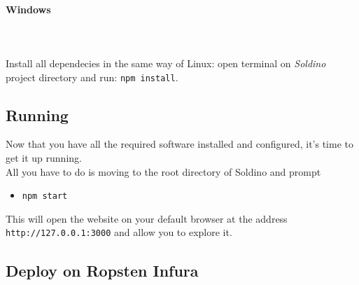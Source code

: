 \paragraph{Windows} \mbox{} \\ \mbox{} \\
Install all dependecies in the same way of Linux: open terminal on \textit{Soldino} project directory and run: \texttt{npm install}.

\subsection{Running}
Now that you have all the required software installed and configured, it's time to get it up running.\\
All you have to do is moving to the root directory of Soldino and prompt
\begin{itemize}
	\item[]\texttt{npm start}
\end{itemize}
This will open the website on your default browser at the address \texttt{http://127.0.0.1:3000} and allow you to explore it.
\subsection{Deploy on Ropsten Infura}


%
% 